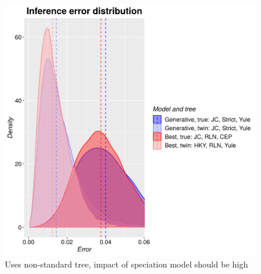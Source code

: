 \begin{figure}[!htbp]
  \includegraphics[width=\textwidth]{razzo-figures/pir_ex_6_errors.png}
  \caption{
    Uses non-standard tree, impact of speciation model should be high
  }
  \label{fig:results}
\end{figure}